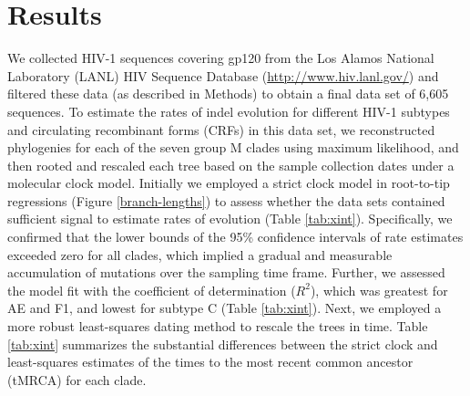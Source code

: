 \documentclass[12pt]{article}
\begin{document}

\section * {Results}

We collected HIV-1 sequences covering gp120 from the Los Alamos National Laboratory (LANL) HIV Sequence Database (\url{http://www.hiv.lanl.gov/}) and filtered these data (as described in Methods) to obtain a final data set of 6,605 sequences. 
To estimate the rates of indel evolution for different HIV-1 subtypes and circulating recombinant forms (CRFs) in this data set, we reconstructed phylogenies for each of the seven group M clades using maximum likelihood, and then rooted and rescaled each tree based on the sample collection dates under a molecular clock model.
Initially we employed a strict clock model in root-to-tip regressions (Figure \ref{branch-lengths}) to assess whether the data sets contained sufficient signal to estimate rates of evolution (Table \ref{tab:xint}).
Specifically, we confirmed that the lower bounds of the 95\% confidence intervals of rate estimates exceeded zero for all clades, which implied a gradual and measurable accumulation of mutations over the sampling time frame.
Further, we assessed the model fit with the coefficient of determination ($R^2$), which was greatest for AE and F1, and lowest for subtype C (Table \ref{tab:xint}).
Next, we employed a more robust least-squares dating method \citep{To:2015} to rescale the trees in time.  
Table \ref{tab:xint} summarizes the substantial differences between the strict clock and least-squares estimates of the times to the most recent common ancestor (tMRCA) for each clade.
\end{document}
